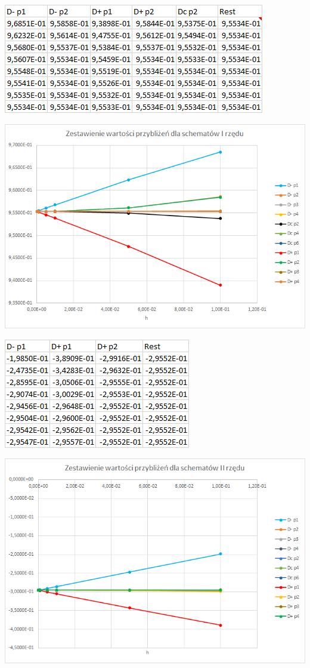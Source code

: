 \includegraphics{Lab2/charts/rz1_e_dane.png}

\includegraphics{Lab2/charts/rz1_e.png}
\newpage


\includegraphics{Lab2/charts/rz2_e_dane.png}

\includegraphics{Lab2/charts/rz2_e.png}

